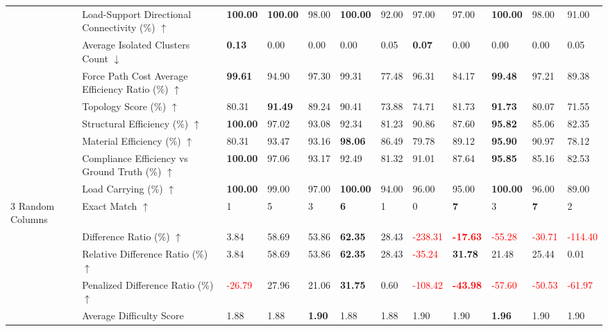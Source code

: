 \begin{table}[!h]
{\begin{tabular}{lllllll|lllll}
 & Load-Support Directional Connectivity (\%) $\uparrow$ & \textbf{100.00} & \textbf{100.00} & 98.00 & \textbf{100.00} & 92.00 & 97.00 & 97.00 & \textbf{100.00} & 98.00 & 91.00 \\
 & Average Isolated Clusters Count $\downarrow$ & \textbf{0.13} & 0.00 & 0.00 & 0.00 & 0.05 & \textbf{0.07} & 0.00 & 0.00 & 0.00 & 0.05 \\
 & Force Path Cost Average Efficiency Ratio (\%) $\uparrow$ & \textbf{99.61} & 94.90 & 97.30 & 99.31 & 77.48 & 96.31 & 84.17 & \textbf{99.48} & 97.21 & 89.38 \\
 & Topology Score (\%) $\uparrow$ & 80.31 & \textbf{91.49} & 89.24 & 90.41 & 73.88 & 74.71 & 81.73 & \textbf{91.73} & 80.07 & 71.55 \\
 & Structural Efficiency (\%) $\uparrow$ & \textbf{100.00} & 97.02 & 93.08 & 92.34 & 81.23 & 90.86 & 87.60 & \textbf{95.82} & 85.06 & 82.35 \\
 & Material Efficiency (\%) $\uparrow$ & 80.31 & 93.47 & 93.16 & \textbf{98.06} & 86.49 & 79.78 & 89.12 & \textbf{95.90} & 90.97 & 78.12 \\
 & Compliance Efficiency vs Ground Truth (\%) $\uparrow$ & \textbf{100.00} & 97.06 & 93.17 & 92.49 & 81.32 & 91.01 & 87.64 & \textbf{95.85} & 85.16 & 82.53 \\
 & Load Carrying (\%) $\uparrow$ & \textbf{100.00} & 99.00 & 97.00 & \textbf{100.00} & 94.00 & 96.00 & 95.00 & \textbf{100.00} & 96.00 & 89.00 \\
\midrule
3 Random Columns & Exact Match $\uparrow$ & 1 & 5 & 3 & \textbf{6} & 1 & 0 & \textbf{7} & 3 & \textbf{7} & 2 \\
 & Difference Ratio (\%) $\uparrow$ & 3.84 & 58.69 & 53.86 & \textbf{62.35} & 28.43 & \textcolor{red}{-238.31} & \textbf{\textcolor{red}{-17.63}} & \textcolor{red}{-55.28} & \textcolor{red}{-30.71} & \textcolor{red}{-114.40} \\
 & Relative Difference Ratio (\%) $\uparrow$ & 3.84 & 58.69 & 53.86 & \textbf{62.35} & 28.43 & \textcolor{red}{-35.24} & \textbf{31.78} & 21.48 & 25.44 & 0.01 \\
 & Penalized Difference Ratio (\%) $\uparrow$ & \textcolor{red}{-26.79} & 27.96 & 21.06 & \textbf{31.75} & 0.60 & \textcolor{red}{-108.42} & \textbf{\textcolor{red}{-43.98}} & \textcolor{red}{-57.60} & \textcolor{red}{-50.53} & \textcolor{red}{-61.97} \\
 & Average Difficulty Score & 1.88 & 1.88 & \textbf{1.90} & 1.88 & 1.88 & 1.90 & 1.90 & \textbf{1.96} & 1.90 & 1.90 \\

\end{tabular}}
\end{table}
